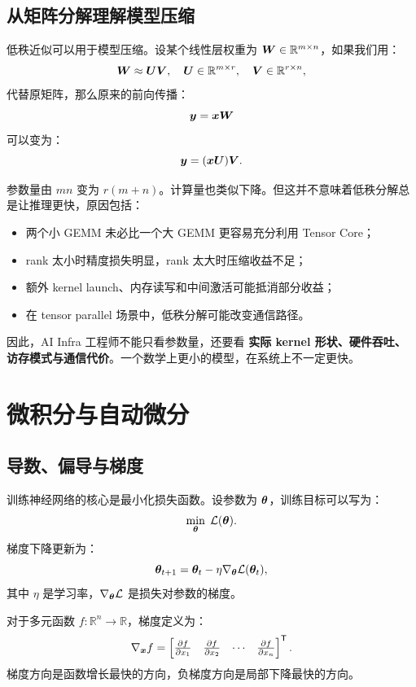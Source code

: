 \subsection{从矩阵分解理解模型压缩}
\label{subsec:model-compression-low-rank}

低秩近似可以用于模型压缩。设某个线性层权重为 $\bm{W}\in\mathbb{R}^{m\times n}$，如果我们用：
\[
  \bm{W}\approx \bm{U}\bm{V},
  \quad
  \bm{U}\in\mathbb{R}^{m\times r},
  \quad
  \bm{V}\in\mathbb{R}^{r\times n},
\]
代替原矩阵，那么原来的前向传播：
\[
  \bm{y}=\bm{x}\bm{W}
\]
可以变为：
\[
  \bm{y}=(\bm{x}\bm{U})\bm{V}.
\]

参数量由 $mn$ 变为 $r(m+n)$。计算量也类似下降。但这并不意味着低秩分解总是让推理更快，原因包括：

\begin{itemize}
  \item 两个小 GEMM 未必比一个大 GEMM 更容易充分利用 Tensor Core；
  \item rank 太小时精度损失明显，rank 太大时压缩收益不足；
  \item 额外 kernel launch、内存读写和中间激活可能抵消部分收益；
  \item 在 tensor parallel 场景中，低秩分解可能改变通信路径。
\end{itemize}

因此，AI Infra 工程师不能只看参数量，还要看 \textbf{实际 kernel 形状、硬件吞吐、访存模式与通信代价}。一个数学上更小的模型，在系统上不一定更快。

\section{微积分与自动微分}
\label{sec:calculus-autodiff}

\subsection{导数、偏导与梯度}
\label{subsec:derivative-gradient}

训练神经网络的核心是最小化损失函数。设参数为 $\bm{\theta}$，训练目标可以写为：
\[
  \min_{\bm{\theta}}\; \mathcal{L}(\bm{\theta}).
\]
梯度下降更新为：
\[
  \bm{\theta}_{t+1}
  =
  \bm{\theta}_t-\eta\nabla_{\bm{\theta}}\mathcal{L}(\bm{\theta}_t),
\]
其中 $\eta$ 是学习率，$\nabla_{\bm{\theta}}\mathcal{L}$ 是损失对参数的梯度。

对于多元函数 $f:\mathbb{R}^{n}\rightarrow\mathbb{R}$，梯度定义为：
\[
  \nabla_{\bm{x}}f
  =
  \begin{bmatrix}
    \frac{\partial f}{\partial x_1}&
    \frac{\partial f}{\partial x_2}&
    \cdots&
    \frac{\partial f}{\partial x_n}
  \end{bmatrix}^{\mathsf{T}}.
\]
梯度方向是函数增长最快的方向，负梯度方向是局部下降最快的方向。

